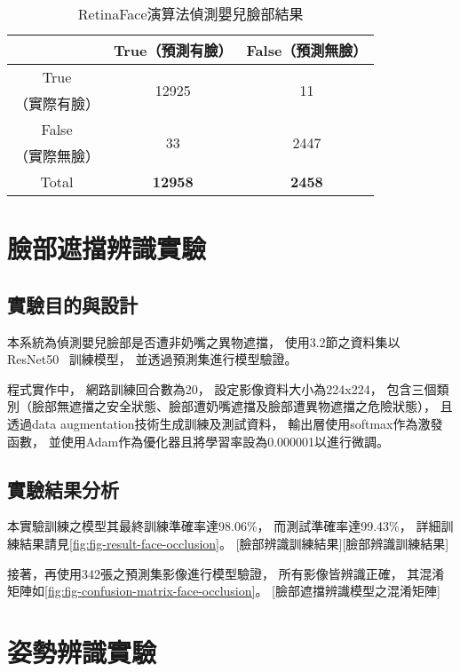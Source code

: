 \documentclass[class=NCU_thesis, crop=false]{standalone}
\begin{document}
\begin{table}[h]
    \centering
    \caption{RetinaFace演算法偵測嬰兒臉部結果}
    \label{table:table-retinaface}
    \begin{tabular}{ccc}
    \hline
     & True（預測有臉）& False（預測無臉）\\
    \hline
    True & \multirow{2}{*}{12925} & \multirow{2}{*}{11} \\
    （實際有臉）& & \\
    False & \multirow{2}{*}{33} & \multirow{2}{*}{2447} \\
    （實際無臉）&  & \\
    \hline
    Total & \textbf{12958} & \textbf{2458} \\
    \hline
    \end{tabular}
\end{table}

\section{臉部遮擋辨識實驗}
\subsection{實驗目的與設計}
本系統為偵測嬰兒臉部是否遭非奶嘴之異物遮擋，
使用3.2節之資料集以ResNet50~\cite{he_deep_2016}
訓練模型，
並透過預測集進行模型驗證。

程式實作中，
網路訓練回合數為20，
設定影像資料大小為224x224，
包含三個類別（臉部無遮擋之安全狀態、臉部遭奶嘴遮擋及臉部遭異物遮擋之危險狀態），
且透過data augmentation技術生成訓練及測試資料，
輸出層使用softmax作為激發函數，
並使用Adam作為優化器且將學習率設為0.000001以進行微調。

\subsection{實驗結果分析}
本實驗訓練之模型其最終訓練準確率達98.06\%，
而測試準確率達99.43\%，
詳細訓練結果請見\cref{fig:fig-result-face-occlusion}。
[臉部辨識訓練結果][臉部辨識訓練結果]

接著，再使用342張之預測集影像進行模型驗證，
所有影像皆辨識正確，
其混淆矩陣如\cref{fig:fig-confusion-matrix-face-occlusion}。
[臉部遮擋辨識模型之混淆矩陣]

\section{姿勢辨識實驗}
\end{document}
